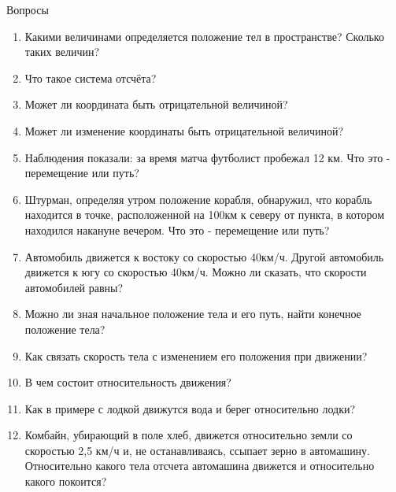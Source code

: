 \documentclass[a6paper, 11pt]{diss_4}
\renewcommand{\'}{\,'}
\begin{document}
\begin{center}
   Вопросы
\end{center}
\begin{enumerate}
\item Какими величинами определяется положение тел в пространстве? Сколько таких величин?
\item Что такое система отсчёта?
\item Может ли координата быть отрицательной величиной?
\item Может ли изменение координаты быть отрицательной величиной?
\item Наблюдения показали: за время матча футболист пробежал 12 км. Что это - перемещение или путь?
\item Штурман, определяя утром положение корабля, обнаружил, что корабль находится в точке, расположенной на 100км к северу от пункта, в котором находился накануне вечером. Что это - перемещение или путь?
\item Автомобиль движется к востоку со скоростью 40км/ч. Другой автомобиль движется к югу со скоростью 40км/ч. Можно ли сказать, что скорости автомобилей равны?
\item Можно ли зная начальное положение тела и его путь, найти конечное положение тела?
\item Как связать скорость тела с изменением его положения при движении?
\item В   чем   состоит   относительность   движения?
\item Как   в   примере   с   лодкой   движутся вода и берег относительно лодки?
\item Комбайн,   убирающий   в   поле    хлеб, движется относительно земли со скоростью 2,5 км/ч и, не останавливаясь, ссыпает зерно в автомашину. Относительно какого тела отсчета автомашина движется и относительно какого покоится?
\end{enumerate}
\end{document}
